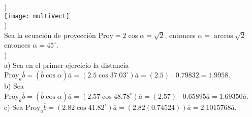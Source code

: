 \documentclass[11pt,a4paper]{article}
\begin{document}
\begin{justify}
)\\

\noindent
\texttt{[image: multiVect]}\\


)\\

Sea la ecuación de proyección $\text{Proy} = 2 \cos \alpha = \sqrt{2}$, entonces $\alpha =\arccos \sqrt{2} $ entonces $\alpha = 45^{\circ}$.\\

)\\

\noindent
a) Sea en el primer ejercicio la distancia $\text{Proy}_{\overline{a}} \overline{b} = (\overline{b}\cos \alpha)\overline{a} =(2.5 \cos 37.03^{\circ})\overline{a} = \left(2.5\right)\cdot \:0.79832=1.9958$.\\

\noindent
b) Sea $\text{Proy}_{\overline{a}} \overline{b} = (\overline{b}\cos \alpha)\overline{a} = (2.57\cos 48.78^{\circ})\overline{a} = \left(2.57\right)\cdot \:0.65895 \overline{a}=1.69350 \overline{a}$.\\

\noindent
c) Sea $\text{Proy}_{\overline{a}} \overline{b} = (2.82 \cos 41.82^{\circ})\overline{a} = (2.82 (0.74524))\overline{a} = 2.1015768 \overline{a}$.\\





\end{justify}



\newpage

\nocite{tippens2007fisica}



\end{document}
